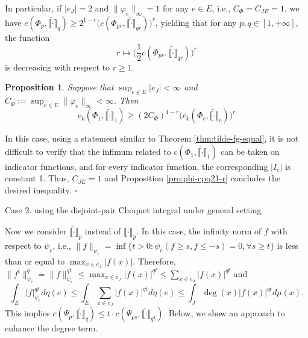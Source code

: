 \documentclass[12pt,a4paper]{article}
\newtheorem{prop}[theorem]{Proposition}
\newenvironment{proof}{\medskip\noindent{\bf Proof. }}{\hfill$\square$\medskip}
\begin{document}
In particular, if $|e_J|=2$ and $\|\varphi_e\|_\infty=1$ for any $e\in E$, i.e., $C_{\Phi}=C_{JE}=1$, we have $c(\Phi_p,\widetilde{\llbracket \cdot\rrbracket}_{q})\ge2^{1-r}\big(c(\Phi_{pr},\widetilde{\llbracket \cdot\rrbracket}_{qr})\big)^r$, yielding that for any $p,q\in [1,+\infty]$, the function 
$$r\mapsto \big(\frac12c(\Phi_{pr},\widetilde{\llbracket \cdot\rrbracket}_{qr})\big)^r$$
is decreasing with respect to $r\ge 1$.


\begin{prop}
Suppose that $\sup_{e\in E}|e_J|<\infty$ and $C_{\Phi}:=\sup_{e\in E}\|\varphi_e\|_\infty<\infty$. Then
$$c_k(\Phi_1,\widetilde{\llbracket \cdot\rrbracket}_{1})\ge  (2C_{\Phi})^{1-r}\big(c_k(\Phi_{r},\widetilde{\llbracket \cdot\rrbracket}_{r})\big)^r$$ 
\end{prop}
\begin{proof}
In this case, using a statement similar to Theorem \ref{thm:tilde-fg-equal}, it is not difficult to verify that the infimum related to $c(\Phi_1,\widetilde{\llbracket \cdot\rrbracket}_{1})$ can be taken on indicator functions, and for every indicator function, the corresponding $|I_e|$ is constant 1.
Thus, $C_{JE}=1$ and Proposition \ref{pro:phi-cpq21-r} concludes the desired inequality.  
\end{proof}

\noindent Case 2. using the disjoint-pair  Choquet integral under general setting  

Now we consider $\widetilde{\llbracket \cdot\rrbracket}_p$ instead of $\llbracket \cdot\rrbracket_p$. In this case, the infinity norm of $f$ with respect to $\psi_e$, i.e., $\|f\|_{\psi_e}=\inf\{t>0:\psi_e(f\ge s,f\le-s)= 0,\forall s\ge t\}$  is less than or equal to $\max_{x\in e_J}|f(x)|$. Therefore, $\|f^t\|_{\psi_e}^{q}=\|f\|_{\psi_e}^{qt}\le \max_{x\in e_J}|f(x)|^{qt}\le \sum_{x\in e_J}|f(x)|^{qt}$ and $$\int_E|f|_{\psi_e}^{qt}d\eta(e)\le \int_E\sum_{x\in e_J}|f(x)|^{qt}d\eta(e)\le\int_J\deg(x)|f(x)|^{qt}d\mu(x).$$  
This implies $c(\Psi_p,\widetilde{\llbracket \cdot\rrbracket}_{q})\le t\cdot  c(\Psi_{ps},\widetilde{\llbracket \cdot\rrbracket}_{qt})$. Below, we show an approach to enhance the degree term. 
\end{document}
